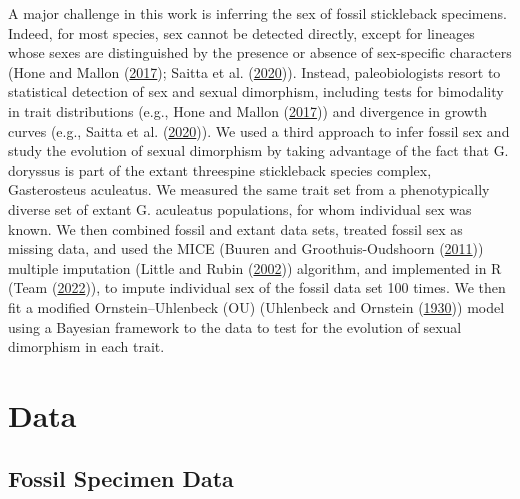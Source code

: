 \documentclass[
  12pt,
]{article}
\begin{document}
A major challenge in this work is inferring the sex of fossil
stickleback specimens. Indeed, for most species, sex cannot be detected
directly, except for lineages whose sexes are distinguished by the
presence or absence of sex-specific characters (Hone and Mallon
(\protect\hyperlink{ref-Hone2017}{2017}); Saitta et al.
(\protect\hyperlink{ref-SaittaEtAl2020}{2020})). Instead,
paleobiologists resort to statistical detection of sex and sexual
dimorphism, including tests for bimodality in trait distributions (e.g.,
Hone and Mallon (\protect\hyperlink{ref-Hone2017}{2017})) and divergence
in growth curves (e.g., Saitta et al.
(\protect\hyperlink{ref-SaittaEtAl2020}{2020})). We used a third
approach to infer fossil sex and study the evolution of sexual
dimorphism by taking advantage of the fact that G. doryssus is part of
the extant threespine stickleback species complex, Gasterosteus
aculeatus. We measured the same trait set from a phenotypically diverse
set of extant G. aculeatus populations, for whom individual sex was
known. We then combined fossil and extant data sets, treated fossil sex
as missing data, and used the MICE (Buuren and Groothuis-Oudshoorn
(\protect\hyperlink{ref-MICE}{2011})) multiple imputation (Little and
Rubin (\protect\hyperlink{ref-little2002statistical}{2002})) algorithm,
and implemented in R (Team
(\protect\hyperlink{ref-R2022language}{2022})), to impute individual sex
of the fossil data set 100 times. We then fit a modified
Ornstein--Uhlenbeck (OU) (Uhlenbeck and Ornstein
(\protect\hyperlink{ref-OUProcess}{1930})) model using a Bayesian
framework to the data to test for the evolution of sexual dimorphism in
each trait.

\hypertarget{sec:data}{%
\section{Data}\label{sec:data}}

\hypertarget{fossil-specimen-data}{%
\subsection{Fossil Specimen Data}\label{fossil-specimen-data}}
\end{document}
